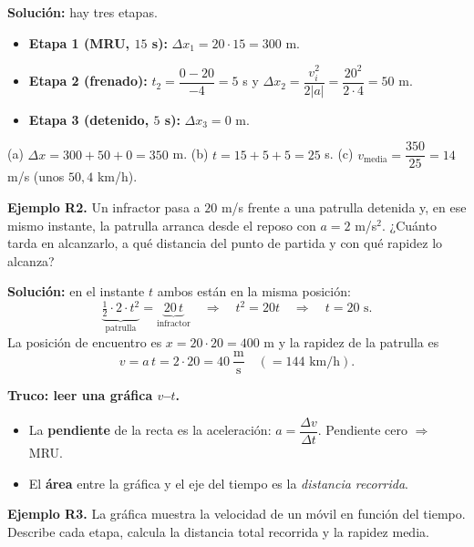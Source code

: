 \documentclass[12pt, letterpaper]{article}
\begin{document}
\begin{cuadrosolucion}
  \textbf{Solución:} hay tres etapas.
  \begin{itemize}[leftmargin=*]
    \item \textbf{Etapa 1 (MRU, $15$ s):} $\Delta x_1 = 20 \cdot 15 = 300$ m.
    \item \textbf{Etapa 2 (frenado):} $t_2 = \dfrac{0 - 20}{-4} = 5$ s y $\Delta x_2 = \dfrac{v_i^2}{2|a|} = \dfrac{20^2}{2 \cdot 4} = 50$ m.
    \item \textbf{Etapa 3 (detenido, $5$ s):} $\Delta x_3 = 0$ m.
  \end{itemize}
  (a) $\Delta x = 300 + 50 + 0 = 350$ m. \quad (b) $t = 15 + 5 + 5 = 25$ s.
  (c) $v_{\text{media}} = \dfrac{350}{25} = 14$ m/s (unos $50{,}4$ km/h).
\end{cuadrosolucion}

\textbf{Ejemplo R2.} Un infractor pasa a $20$ m/s frente a una patrulla detenida y, en ese mismo instante, la patrulla arranca desde el reposo con $a = 2$ m/s$^2$. ¿Cuánto tarda en alcanzarlo, a qué distancia del punto de partida y con qué rapidez lo alcanza?

\begin{cuadrosolucion}
  \textbf{Solución:} en el instante $t$ ambos están en la misma posición:
  $$\underbrace{\tfrac{1}{2} \cdot 2 \cdot t^2}_{\text{patrulla}} = \underbrace{20\,t}_{\text{infractor}} \quad \Rightarrow \quad t^2 = 20t \quad \Rightarrow \quad t = 20 \text{ s}.$$
  La posición de encuentro es $x = 20 \cdot 20 = 400$ m y la rapidez de la patrulla es
  $$v = a\,t = 2 \cdot 20 = 40 \ \frac{\text{m}}{\text{s}} \quad (= 144 \text{ km/h}).$$
\end{cuadrosolucion}

\begin{cuadroextra}
  \textbf{Truco: leer una gráfica $v$--$t$.}
  \begin{itemize}[leftmargin=*]
    \item La \textbf{pendiente} de la recta es la aceleración: $a = \dfrac{\Delta v}{\Delta t}$. Pendiente cero $\Rightarrow$ MRU.
    \item El \textbf{área} entre la gráfica y el eje del tiempo es la \emph{distancia recorrida}.
  \end{itemize}
\end{cuadroextra}

\newpage

\textbf{Ejemplo R3.} La gráfica muestra la velocidad de un móvil en función del tiempo. Describe cada etapa, calcula la distancia total recorrida y la rapidez media.
\end{document}
